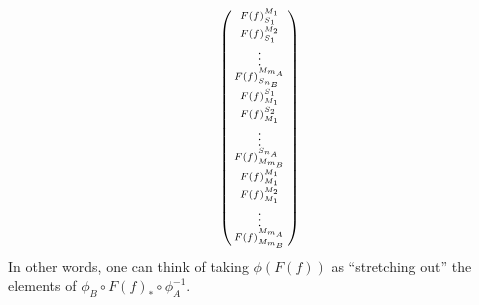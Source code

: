 \begin{remark}
\[\begin{psmallmatrix}
            F(f)_{S_1}^{M_1} \\
            F(f)_{S_1}^{M_2} \\
            \vdots \\
            F(f)_{S_{n_B}}^{M_{m_A}} \\
            F(f)_{M_1}^{S_1} \\
            F(f)_{M_1}^{S_2} \\
            \vdots \\
            F(f)_{M_{m_B}}^{S_{n_A}} \\
            F(f)_{M_1}^{M_1} \\
            F(f)_{M_1}^{M_2} \\
            \vdots \\
            F(f)_{M_{m_B}}^{M_{m_A}}
        \end{psmallmatrix}
    \]
    In other words, one can think of taking \( \phi(F(f)) \) as ``stretching out'' the elements of \( \phi_B \circ F(f)_* \circ \phi_A^{-1} \).
\end{remark}
